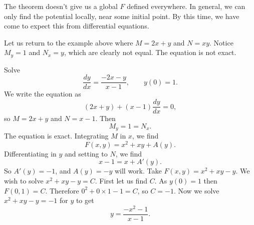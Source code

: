 \documentclass[12pt]{book}
\begin{document}
The theorem doesn't give us a global $F$ defined everywhere.  In
general, we can only find the potential locally, near some initial point.
By this time, we have come to expect this from differential
equations.

Let us return to the example above where $M = 2x + y$ and $N = xy$.  
Notice 
$M_y = 1$ and  $N_x =
y$, which are clearly not equal.  The equation is not exact.

\begin{example}
Solve
\begin{equation*}
\frac{dy}{dx} = \frac{-2x-y}{x-1}, \qquad y(0) = 1.
\end{equation*}
We write the equation as
\begin{equation*}
(2x+y) + (x-1)\frac{dy}{dx} = 0 ,
\end{equation*}
so $M = 2x+y$ and $N = x-1$.  Then
\begin{equation*}
M_y = 1 = N_x .
\end{equation*}
The equation is exact.
Integrating $M$ in $x$, we find
\begin{equation*}
F(x,y) = x^2+xy + A(y) .
\end{equation*}
Differentiating in $y$ and setting to $N$, we find
\begin{equation*}
x-1 = x + A'(y) .
\end{equation*}
So $A'(y) = -1$, and $A(y) = -y$ will work.  Take $F(x,y) = x^2+xy-y$.  We
wish to solve $x^2+xy-y = C$.  First let us find $C$.  As $y(0)=1$ then
$F(0,1) = C$.  Therefore $0^2+0\times 1 - 1 = C$, so $C=-1$.  Now we solve
$x^2+xy-y = -1$ for $y$ to get
\begin{equation*}
y = \frac{-x^2-1}{x-1} .
\end{equation*}
\end{example}
\end{document}
